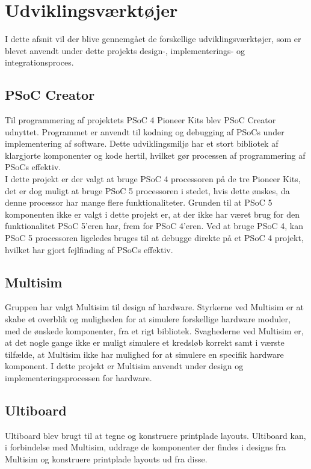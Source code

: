 \section{Udviklingsværktøjer}
\label{ch:Udviklingsvaerktoejer}

I dette afsnit vil der blive gennemgået de forskellige udviklingsværktøjer, som er blevet anvendt under dette projekts design-, implementerings- og integrationsproces.

\subsection{PSoC Creator}
Til programmering af projektets PSoC 4 Pioneer Kits blev PSoC Creator udnyttet. Programmet er anvendt til kodning og debugging af PSoCs under implementering af software. Dette udviklingsmiljø har et stort bibliotek af klargjorte komponenter og kode hertil, hvilket gør processen af programmering af PSoCs effektiv.\\
I dette projekt er der valgt at bruge PSoC 4 processoren på de tre Pioneer Kits, det er dog muligt at bruge PSoC 5 processoren i stedet, hvis dette ønskes, da denne processor har mange flere funktionaliteter. Grunden til at PSoC 5 komponenten ikke er valgt i dette projekt er, at der ikke har været brug for den funktionalitet PSoC 5'eren har, frem for PSoC 4'eren. Ved at bruge PSoC 4, kan PSoC 5 processoren ligeledes bruges til at debugge direkte på et PSoC 4 projekt, hvilket har gjort fejlfinding af PSoCs effektiv.

\subsection{Multisim}
Gruppen har valgt Multisim til design af hardware. Styrkerne ved Multisim er at skabe et overblik og muligheden for at simulere forskellige hardware moduler, med de ønskede komponenter, fra et rigt bibliotek. Svaghederne ved Multisim er, at det nogle gange ikke er muligt simulere et kredsløb korrekt samt i værste tilfælde, at Multisim ikke har mulighed for at simulere en specifik hardware komponent. I dette projekt er Multisim anvendt under design og implementeringsprocessen for hardware.

\subsection{Ultiboard}
Ultiboard blev brugt til at tegne og konstruere printplade layouts. Ultiboard kan, i forbindelse med Multisim, uddrage de komponenter der findes i designs fra Multisim og konstruere printplade layouts ud fra disse.

